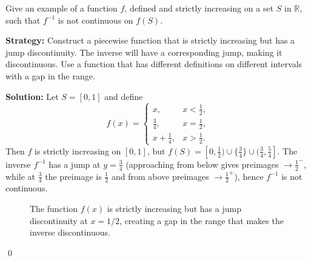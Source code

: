 \begin{problembox}
Give an example of a function $f$, defined and strictly increasing on a set $S$ in $\mathbb{R}$, such that $f^{-1}$ is not continuous on $f(S)$.
\end{problembox}

\noindent\textbf{Strategy:} Construct a piecewise function that is strictly increasing but has a jump discontinuity. The inverse will have a corresponding jump, making it discontinuous. Use a function that has different definitions on different intervals with a gap in the range.

\bigskip\noindent\textbf{Solution:}
Let $S=[0,1]$ and define
\[
f(x)=\begin{cases}
x,& x<\tfrac12,\\
\tfrac34,& x=\tfrac12,\\
x+\tfrac14,& x>\tfrac12.
\end{cases}
\]
Then $f$ is strictly increasing on $[0,1]$, but $f(S)=[0,\tfrac12)\cup\{\tfrac34\}\cup(\tfrac34,\tfrac54]$. The inverse $f^{-1}$ has a jump at $y=\tfrac34$ (approaching from below gives preimages $\to\tfrac12^-$, while at $\tfrac34$ the preimage is $\tfrac12$ and from above preimages $\to\tfrac12^+$), hence $f^{-1}$ is not continuous.

\begin{figure}[h]
\centering
{}
\caption{The function $f(x)$ is strictly increasing but has a jump discontinuity at $x=1/2$, creating a gap in the range that makes the inverse discontinuous.}
\end{figure}\qed



